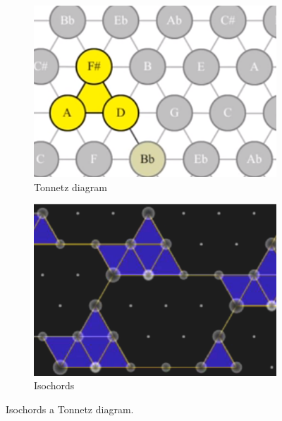 \documentclass[thesis=B, czech]{FITthesis}[2019/03/06]
\begin{document}
\begin{figure}[h]
\centering
  \begin{subfigure}[b]{0.4\textwidth}
    \includegraphics[width=\textwidth]{images/isochords.png}
    \caption{Tonnetz diagram}
    \label{fig:tonnetz}
  \end{subfigure}
  \begin{subfigure}[b]{0.4\textwidth}
    \includegraphics[width=\textwidth]{images/isochords2.png}
    \caption{Isochords}
    \label{fig:iso}
  \end{subfigure}
    \label{fig:isochords}
    \caption{Isochords a Tonnetz diagram.}
\end{figure}
\end{document}
